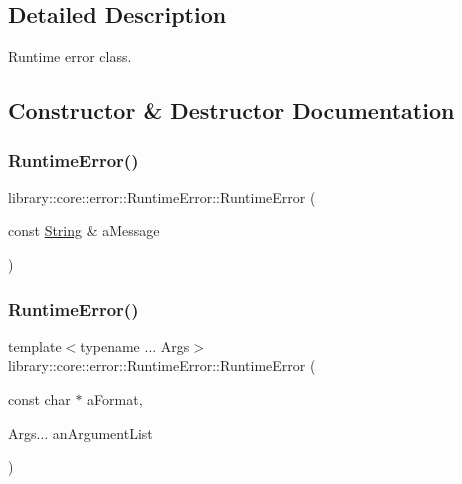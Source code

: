 \subsection{Detailed Description}
Runtime error class. 

\subsection{Constructor \& Destructor Documentation}
\mbox{\label{classlibrary_1_1core_1_1error_1_1_runtime_error_a6ba0ac577d200ad5f83843ecbe775c2f}} 
\subsubsection{\texorpdfstring{RuntimeError()}{RuntimeError()}\hspace{0.1cm}{\footnotesize\ttfamily [1/2]}}
{\footnotesize\ttfamily library\+::core\+::error\+::\+Runtime\+Error\+::\+Runtime\+Error (\begin{DoxyParamCaption}\item[{const \mbox{\hyperlink{classlibrary_1_1core_1_1types_1_1_string}{String}} \&}]{a\+Message }\end{DoxyParamCaption})}

\mbox{\label{classlibrary_1_1core_1_1error_1_1_runtime_error_a4ac1bac63f4c46fe10e7c96d545c6e4a}} 
\subsubsection{\texorpdfstring{RuntimeError()}{RuntimeError()}\hspace{0.1cm}{\footnotesize\ttfamily [2/2]}}
{\footnotesize\ttfamily template$<$typename ... Args$>$ \\
library\+::core\+::error\+::\+Runtime\+Error\+::\+Runtime\+Error (\begin{DoxyParamCaption}\item[{const char $\ast$}]{a\+Format,  }\item[{Args...}]{an\+Argument\+List }\end{DoxyParamCaption})\hspace{0.3cm}{\ttfamily [inline]}}


